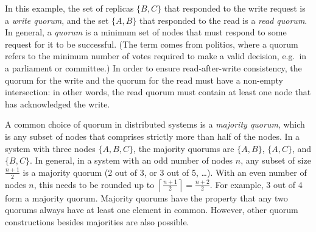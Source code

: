 In this example, the set of replicas $\{B, C\}$ that responded to the write request is a \emph{write quorum}, and the set $\{A, B\}$ that responded to the read is a \emph{read quorum}.
In general, a \emph{quorum} is a minimum set of nodes that must respond to some request for it to be successful.
(The term comes from politics, where a quorum refers to the minimum number of votes required to make a valid decision, e.g.\ in a parliament or committee.)
In order to ensure read-after-write consistency, the quorum for the write and the quorum for the read must have a non-empty intersection: in other words, the read quorum must contain at least one node that has acknowledged the write.

A common choice of quorum in distributed systems is a \emph{majority quorum}, which is any subset of nodes that comprises strictly more than half of the nodes.
In a system with three nodes $\{A,B,C\}$, the majority quorums are $\{A,B\}$, $\{A,C\}$, and $\{B,C\}$.
In general, in a system with an odd number of nodes $n$, any subset of size $\frac{n+1}{2}$ is a majority quorum (2 out of 3, or 3 out of 5, \dots).
With an even number of nodes $n$, this needs to be rounded up to $\left\lceil\frac{n+1}{2}\right\rceil = \frac{n+2}{2}$.
For example, 3 out of 4 form a majority quorum.
Majority quorums have the property that any two quorums always have at least one element in common.
However, other quorum constructions besides majorities are also possible.

